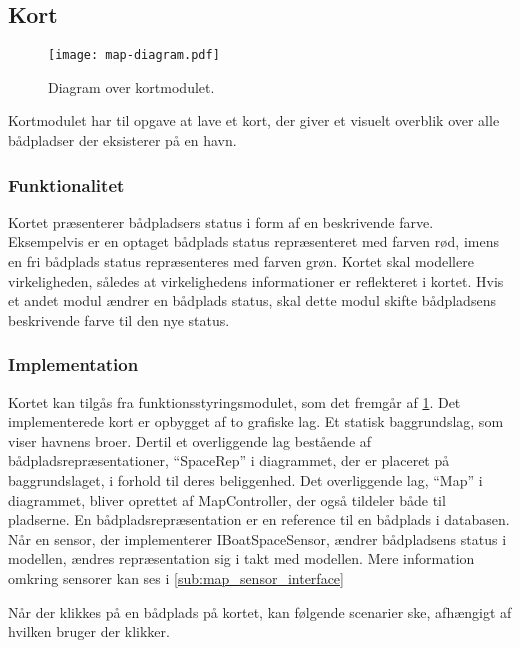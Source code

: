 \subsection{Kort}
\label{sub:kort}

\begin{figure}
  \centering
  \texttt{[image: map-diagram.pdf]}
  \caption{Diagram over kortmodulet.}
  \label{fig:map_diagram}
\end{figure}

Kortmodulet har til opgave at lave et kort, der giver et visuelt overblik over alle bådpladser der eksisterer på en havn.

\subsubsection{Funktionalitet}
\label{ssub:kort_funktionalitet}

Kortet præsenterer bådpladsers status i form af en beskrivende farve. Eksempelvis er en optaget bådplads status repræsenteret med farven rød, imens en fri bådplads status repræsenteres med farven grøn. Kortet skal modellere virkeligheden, således at virkelighedens informationer er reflekteret i kortet. Hvis et andet modul ændrer en bådplads status, skal dette modul skifte bådpladsens beskrivende farve til den nye status.

\subsubsection{Implementation}
\label{ssub:kort_implementation}

Kortet kan tilgås fra funktionsstyringsmodulet, som det fremgår af \cref{fig:map_diagram}. Det implementerede kort er opbygget af to grafiske lag. Et statisk baggrundslag, som viser havnens broer. Dertil et overliggende lag bestående af bådpladsrepræsentationer, \enquote{SpaceRep} i diagrammet, der er placeret på baggrundslaget, i forhold til deres beliggenhed. Det overliggende lag, \enquote{Map} i diagrammet, bliver oprettet af MapController, der også tildeler både til pladserne. En bådpladsrepræsentation er en reference til en bådplads i databasen. Når en sensor, der implementerer IBoatSpaceSensor, ændrer bådpladsens status i modellen, ændres repræsentation sig i takt med modellen. Mere information omkring sensorer kan ses i \cref{sub:map_sensor_interface}

Når der klikkes på en bådplads på kortet, kan følgende scenarier ske, afhængigt af hvilken bruger der klikker.


